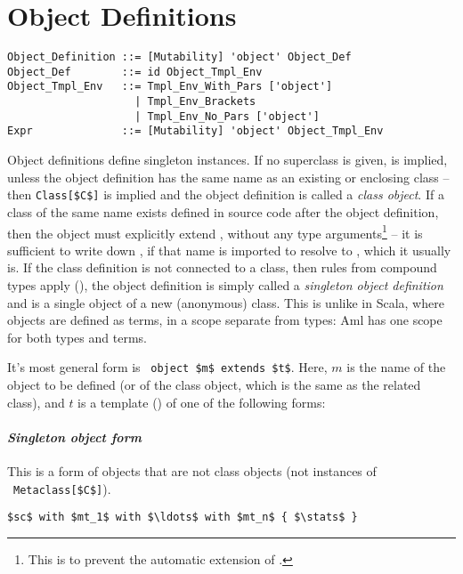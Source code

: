 \section{Object Definitions}
\label{sec:object-definitions}

\grammar\begin{lstlisting}
Object_Definition ::= [Mutability] 'object' Object_Def
Object_Def        ::= id Object_Tmpl_Env
Object_Tmpl_Env   ::= Tmpl_Env_With_Pars ['object']
                    | Tmpl_Env_Brackets
                    | Tmpl_Env_No_Pars ['object']
Expr              ::= [Mutability] 'object' Object_Tmpl_Env
\end{lstlisting}

Object definitions define singleton instances. If no superclass is given,  is implied, unless the object definition has the same name as an existing or enclosing class -- then \lstinline!Class[$C$]! is implied and the object definition is called a {\em class object}. If a class of the same name exists defined in source code after the object definition, then the object must explicitly extend , without any type arguments\footnote{This is to prevent the automatic extension of .} -- it is sufficient to write down , if that name is imported to resolve to , which it usually is. If the class definition is not connected to a class, then rules from compound types apply (), the object definition is simply called a {\em singleton object definition} and is a single object of a new (anonymous) class. This is unlike in Scala, where objects are defined as terms, in a scope separate from types: Aml has one scope for both types and terms. 

It's most general form is ~\lstinline!object $m$ extends $t$!. Here, $m$ is the name of the object to be defined (or of the class object, which is the same as the related class), and $t$ is a template () of one of the following forms:

\paragraph{\em Singleton object form}
This is a form of objects that are not class objects (not instances of ~\lstinline!Metaclass[$C$]!). 
\begin{lstlisting}
$sc$ with $mt_1$ with $\ldots$ with $mt_n$ { $\stats$ }
\end{lstlisting}

